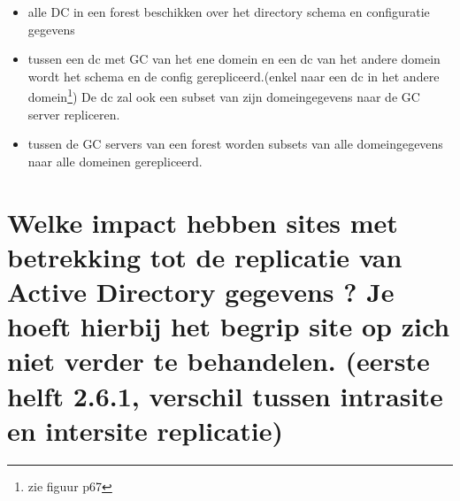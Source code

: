 \begin{itemize}
\item alle DC in een forest beschikken over het directory schema en configuratie gegevens
\item tussen een dc met GC van het ene domein en een dc van het andere domein wordt het schema en de config gerepliceerd.(enkel naar een dc in het andere domein\footnote{zie figuur p67}) De dc zal ook een subset van zijn domeingegevens naar de GC server repliceren.
\item tussen de GC servers van een forest worden subsets van alle domeingegevens naar alle domeinen gerepliceerd.
\end{itemize}

\section{Welke impact hebben sites met betrekking tot de replicatie van Active Directory gegevens ? Je hoeft hierbij het begrip site op zich niet verder te behandelen. (eerste helft 2.6.1, verschil tussen intrasite en intersite replicatie)}

